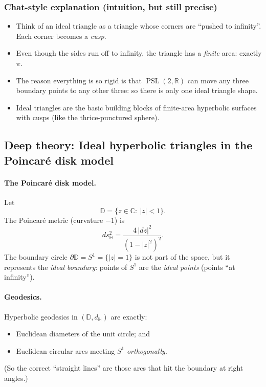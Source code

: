 \documentclass[12pt,a4paper]{article}
\newcommand{\C}{\mathbb{C}}
\newcommand{\hyp}{\mathbb{H}}
\newcommand{\R}{\mathbb{R}}
\DeclareMathOperator{\PSL}{PSL}
\newcommand{\DD}{\mathbb{D}}
\theoremstyle{plain}
\theoremstyle{definition}      %
\begin{document}
	\subsubsection*{Chat-style explanation (intuition, but still precise)}
	\begin{itemize}
		\item Think of an ideal triangle as a triangle whose corners are ``pushed to infinity''. Each corner becomes a \emph{cusp}.
		\item Even though the sides run off to infinity, the triangle has a \emph{finite} area: exactly $\pi$.
		\item The reason everything is so rigid is that $\PSL(2,\R)$ can move any three boundary points to any other three:
		so there is only one ideal triangle shape.
		\item Ideal triangles are the basic building blocks of finite-area hyperbolic surfaces with cusps (like the thrice-punctured sphere).
	\end{itemize}
	
	\subsection*{Deep theory: Ideal hyperbolic triangles in the Poincar\'e disk model}
	
	\paragraph{The Poincar\'e disk model.}
	Let
	\[
	\DD=\{z\in\C:\ |z|<1\}.
	\]
	The Poincar\'e metric (curvature $-1$) is
	\[
	ds^2_{\hyp}=\frac{4\,|dz|^2}{(1-|z|^2)^2}.
	\]
	The boundary circle $\partial\DD=S^1=\{|z|=1\}$ is not part of the space, but it represents the \emph{ideal boundary}:
	points of $S^1$ are the \emph{ideal points} (points ``at infinity'').
	
	\paragraph{Geodesics.}
	Hyperbolic geodesics in $(\DD,d_{\hyp})$ are exactly:
	\begin{itemize}
		\item Euclidean diameters of the unit circle; and
		\item Euclidean circular arcs meeting $S^1$ \emph{orthogonally}.
	\end{itemize}
	(So the correct ``straight lines'' are those arcs that hit the boundary at right angles.)
	
\end{document}
